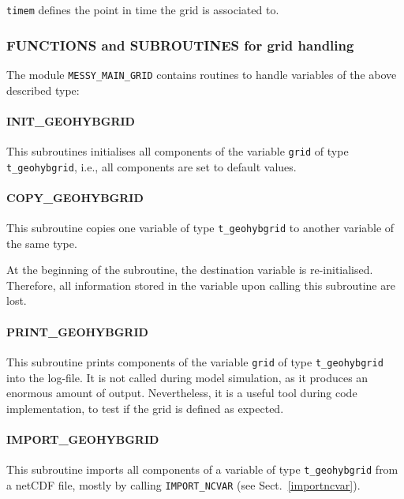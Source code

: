 \documentclass[11pt,twoside]{article}
\begin{document}
\verb|timem| defines the point in time the grid is associated to.

\subsubsection{FUNCTIONS and SUBROUTINES for grid handling}
The module \verb|MESSY_MAIN_GRID| contains routines to handle
variables of the above described type:

\paragraph{INIT\_GEOHYBGRID\\ \label{INITGHG}}
This subroutines initialises all components of the variable \verb|grid| of
 type \verb|t_geohybgrid|, i.e., all components are set to
default values.

\paragraph{COPY\_GEOHYBGRID\\\label{COPYGHG}}
This subroutine copies one variable of type \verb|t_geohybgrid| to another
variable of the same type.

At the beginning of the subroutine, the destination variable is
re-initialised. Therefore, all information stored in the variable upon
calling this subroutine are lost.


\paragraph{PRINT\_GEOHYBGRID\\\label{PRNTGHG}}
This subroutine prints components of the variable \verb|grid| of type
\verb|t_geohybgrid| into the log-file. It is not called during model
 simulation, as it produces an enormous amount of output. 
Nevertheless, it is a useful tool during code implementation, to test
if the grid is defined as expected. 

\paragraph{IMPORT\_GEOHYBGRID\\\label{IMPGRID}}
This subroutine imports all components of a variable of type 
\verb|t_geohybgrid| from a netCDF file, mostly by
calling \verb|IMPORT_NCVAR| (see  Sect.~\ref{importncvar}).
\end{document}
